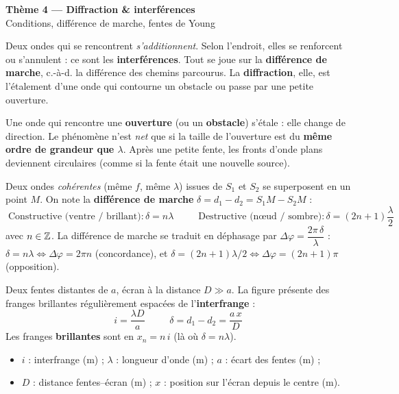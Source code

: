 \documentclass[11pt,a4paper]{article}
\begin{document}

\begin{center}
{\LARGE\bfseries\color{primarydark} Thème 4 — Diffraction \& interférences}\\[2pt]
{\large\color{primary} Conditions, différence de marche, fentes de Young}
\end{center}

\medskip
Deux ondes qui se rencontrent \emph{s'additionnent}. Selon l'endroit, elles se renforcent ou
s'annulent : ce sont les \textbf{interférences}. Tout se joue sur la \textbf{différence de
marche}, c.-à-d. la différence des chemins parcourus. La \textbf{diffraction}, elle, est
l'étalement d'une onde qui contourne un obstacle ou passe par une petite ouverture.

\begin{cle}[diffraction]
Une onde qui rencontre une \textbf{ouverture} (ou un \textbf{obstacle}) s'étale : elle change de
direction. Le phénomène n'est \emph{net} que si la taille de l'ouverture est du \textbf{même
ordre de grandeur que $\lambda$}. Après une petite fente, les fronts d'onde plans deviennent
circulaires (comme si la fente était une nouvelle source).
\end{cle}

\begin{cle}
Deux ondes \emph{cohérentes} (même $f$, même $\lambda$) issues de $S_1$ et $S_2$ se superposent
en un point $M$. On note la \textbf{différence de marche} $\delta=d_1-d_2=S_1M-S_2M$ :
\[ \boxed{\;\text{Constructive (ventre / brillant)} : \delta = n\lambda\;}\qquad
   \boxed{\;\text{Destructive (nœud / sombre)} : \delta = (2n+1)\dfrac{\lambda}{2}\;} \]
avec $n\in\mathbb{Z}$. La différence de marche se traduit en déphasage par
$\Delta\varphi = \dfrac{2\pi\,\delta}{\lambda}$ :
$\delta=n\lambda\Leftrightarrow\Delta\varphi=2\pi n$ (concordance), et
$\delta=(2n+1)\lambda/2\Leftrightarrow\Delta\varphi=(2n+1)\pi$ (opposition).
\end{cle}

\begin{cle}
Deux fentes distantes de $a$, écran à la distance $D\gg a$. La figure présente des franges
brillantes régulièrement espacées de l'\textbf{interfrange} :
\[ \boxed{\;i=\dfrac{\lambda D}{a}\;}\qquad
   \boxed{\;\delta=d_1-d_2=\dfrac{a\,x}{D}\;} \]
Les franges \textbf{brillantes} sont en $x_n=n\,i$ (là où $\delta=n\lambda$).
\begin{itemize}[leftmargin=1.4em,topsep=2pt,itemsep=1pt]
  \item $i$ : interfrange (m) ; $\lambda$ : longueur d'onde (m) ; $a$ : écart des fentes (m) ;
  \item $D$ : distance fentes--écran (m) ; $x$ : position sur l'écran depuis le centre (m).
\end{itemize}
\end{cle}
\end{document}
